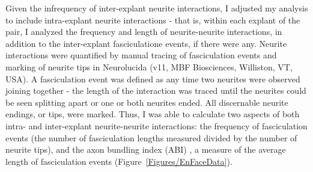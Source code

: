 Given the infrequency of inter-explant neurite interactions, I adjusted my analysis to include intra-explant neurite interactions - that is, within each explant of the pair, I analyzed the frequency and length of neurite-neurite interactions, in addition to the inter-explant fasciculatione events, if there were any.
Neurite interactions were quantified by manual tracing of fasciculation events and marking of neurite tips in Neurolucida (v11, MBF Biosciences, Williston, VT, USA).
A fasciculation event was defined as any time two neurites were observed joining together - the length of the interaction was traced until the neurites could be seen splitting apart or one or both neurites ended.
All discernable neurite endings, or tips, were marked.
Thus, I was able to calculate two aspects of both intra- and inter-explant neurite-neurite interactions: the frequency of fasciculation events (the number of fasciculation lengths measured divided by the number of neurite tips), and the axon bundling index (ABI) \cite[after][]{barry2010polarized}, a measure of the average length of fasciculation events (Figure~\ref{Figures/EnFaceData}).
